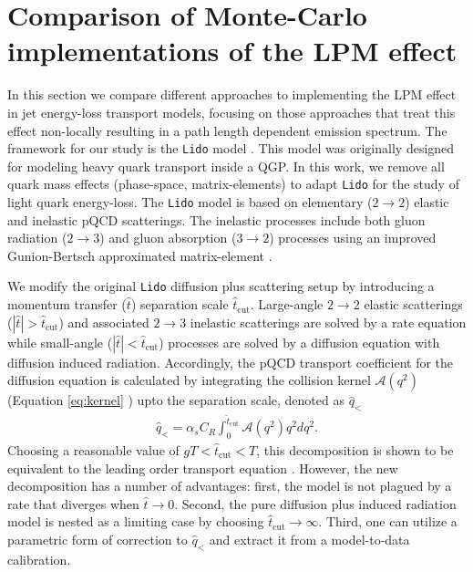 \documentclass[aps, prc, reprint, amsmath, groupedaddress, nofootinbib]{revtex4-1}
\begin{document}
\section{Comparison of Monte-Carlo implementations of the LPM effect}\label{section:MC}
In this section we compare different approaches to implementing the LPM effect in jet energy-loss transport models, focusing on those approaches that treat this effect non-locally resulting in a path length dependent emission spectrum.
The framework for our study is the {\tt Lido} model \cite{Ke:2018tsh}. 
This model was originally designed for modeling  heavy quark transport inside a QGP. 
In this work, we remove all quark mass effects (phase-space, matrix-elements) to adapt {\tt Lido} for the  study of  light quark energy-loss.
The {\tt Lido} model is based on elementary ($2\rightarrow2$) elastic and inelastic pQCD scatterings. 
The inelastic processes include both gluon radiation ($2\rightarrow 3$) and gluon absorption ($3\rightarrow 2$) processes using an improved Gunion-Bertsch approximated matrix-element \cite{Fochler:2013epa,Uphoff:2014hza}.

We modify the original {\tt Lido} diffusion plus scattering setup by introducing a momentum transfer ($\hat{t}$) separation scale $\hat{t}_{\textrm{cut}}$. 
Large-angle $2\rightarrow 2$ elastic scatterings ($|\hat{t}| > \hat{t}_{\textrm{cut}}$) and associated $2\rightarrow 3$ inelastic scatterings are solved by a rate equation while small-angle ($|\hat{t}| < \hat{t}_{\textrm{cut}}$) processes are solved by a diffusion equation with diffusion induced radiation. 
Accordingly, the pQCD transport coefficient for the diffusion equation is  calculated by integrating the collision kernel $\mathcal{A}(q^2)$ (Equation \ref{eq:kernel} ) upto the separation scale, denoted as $\hat{q}_{<}$
\begin{eqnarray}
\hat{q}_{<} = \alpha_s C_R \int_0^{\hat{t}_{\textrm{cut}}} \mathcal{A}(q^2) q^2 dq^2.
\end{eqnarray}
Choosing a reasonable value of $gT < \hat{t}_{\textrm{cut}} < T$, this decomposition is shown to be equivalent to the leading order transport equation \cite{Ghiglieri:2015ala}.
However, the new decomposition has a number of advantages: first, the model is not plagued by a rate that diverges when $\hat{t} \rightarrow 0$.
Second, the pure diffusion plus induced radiation model is nested as a limiting case by choosing $\hat{t}_{\textrm{cut}}\rightarrow \infty$.
Third, one can utilize a parametric form of correction to $\hat{q}_{<}$ and extract it from a model-to-data calibration.
\end{document}
